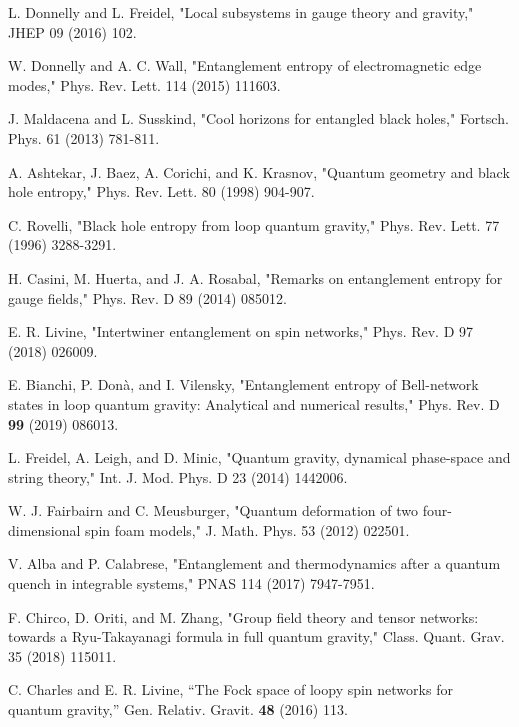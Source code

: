 \documentclass[11pt, a4paper]{article}
\theoremstyle{plain}
\theoremstyle{definition}
\theoremstyle{remark}
\begin{document}

\begin{thebibliography}{99}

 L. Donnelly and L. Freidel, "Local subsystems in gauge theory and gravity," JHEP 09 (2016) 102.

 W. Donnelly and A. C. Wall, "Entanglement entropy of electromagnetic edge modes," Phys. Rev. Lett. 114 (2015) 111603.

 J. Maldacena and L. Susskind, "Cool horizons for entangled black holes," Fortsch. Phys. 61 (2013) 781-811.

 A. Ashtekar, J. Baez, A. Corichi, and K. Krasnov, "Quantum geometry and black hole entropy," Phys. Rev. Lett. 80 (1998) 904-907.

 C. Rovelli, "Black hole entropy from loop quantum gravity," Phys. Rev. Lett. 77 (1996) 3288-3291.

 H. Casini, M. Huerta, and J. A. Rosabal, "Remarks on entanglement entropy for gauge fields," Phys. Rev. D 89 (2014) 085012.

 E. R. Livine, "Intertwiner entanglement on spin networks," Phys. Rev. D 97 (2018) 026009.

 E. Bianchi, P. Donà, and I. Vilensky, "Entanglement entropy of Bell-network states in loop quantum gravity: Analytical and numerical results," Phys. Rev. D \textbf{99} (2019) 086013.

 L. Freidel, A. Leigh, and D. Minic, "Quantum gravity, dynamical phase-space and string theory," Int. J. Mod. Phys. D 23 (2014) 1442006.

 W. J. Fairbairn and C. Meusburger, "Quantum deformation of two four-dimensional spin foam models," J. Math. Phys. 53 (2012) 022501.

 V. Alba and P. Calabrese, "Entanglement and thermodynamics after a quantum quench in integrable systems," PNAS 114 (2017) 7947-7951.

 F. Chirco, D. Oriti, and M. Zhang, "Group field theory and tensor networks: towards a Ryu-Takayanagi formula in full quantum gravity," Class. Quant. Grav. 35 (2018) 115011.

 C. Charles and E. R. Livine, ``The Fock space of loopy spin networks for quantum gravity,'' Gen. Relativ. Gravit. \textbf{48} (2016) 113.


\end{thebibliography}
\end{document}
